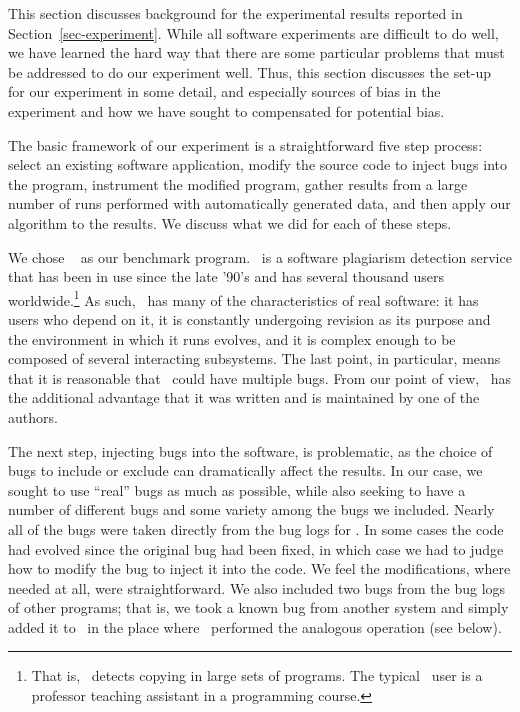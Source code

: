 This section discusses background for the experimental results
reported in Section~\ref{sec-experiment}.  While all software
experiments are difficult to do well, we have learned the hard way
that there are some particular problems that must be addressed to do
our experiment well.  Thus, this section discusses the set-up for our
experiment in some detail, and especially sources of bias in the
experiment and how we have sought to compensated for potential bias.

The basic framework of our experiment is a straightforward five step
process: select an existing software application, modify the source
code to inject bugs into the program, instrument the modified program,
gather results from a large number of runs performed with
automatically generated data, and then apply our algorithm to the
results.  We discuss what we did for each of these steps.

We chose \moss\ \cite{SWA03} as our benchmark program.  \moss\ is a
software plagiarism detection service that has been in use since the
late '90's and has several thousand users worldwide.\footnote{That is,
\moss\ detects copying in large sets of programs.  The typical \moss\
user is a professor teaching assistant in a programming course.}  As
such, \moss\ has many of the characteristics of real software: it has
users who depend on it, it is constantly undergoing revision as its
purpose and the environment in which it runs evolves, and it is
complex enough to be composed of several interacting subsystems.  The
last point, in particular, means that it is reasonable that \moss\
could have multiple bugs.  From our point of view, \moss\ has the
additional advantage that it was written and is maintained by one of
the authors.

The next step, injecting bugs into the software, is problematic, as
the choice of bugs to include or exclude can dramatically affect the
results.  In our case, we sought to use ``real'' bugs as much as
possible, while also seeking to have a number of different bugs and
some variety among the bugs we included.  Nearly all of the bugs were
taken directly from the bug logs for \moss.  In some cases the code
had evolved since the original bug had been fixed, in which case we
had to judge how to modify the bug to inject it into the code.  We
feel the modifications, where needed at all, were straightforward.  We
also included two bugs from the bug logs of other programs; that is,
we took a known bug from another system and simply added it to \moss\
in the place where \moss\ performed the analogous operation (see
below).

